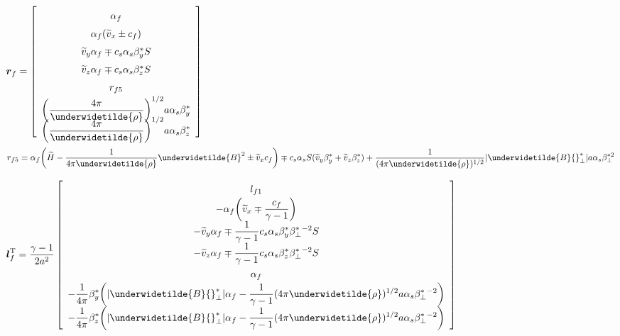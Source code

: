 \begin{center}
$\renewcommand{\arraystretch}{1.5}
\mbox{\boldmath $r$}_{f} =
\left[
\begin{array}{c}
\alpha_{f} \\
\alpha_{f} ( \widetilde{v}_{x} \pm c_{f} ) \\
\widetilde{v}_{y} \alpha_{f} \mp c_{s} \alpha_{s} \beta^{\ast}_{y} S  \\
\widetilde{v}_{z} \alpha_{f} \mp c_{s} \alpha_{s} \beta^{\ast}_{z} S  \\
r_{f5} \\
\displaystyle
\biggl( \frac{4 \pi}{\underwidetilde{\rho}} \biggr)^{1/2}
a \alpha_{s} \beta^{\ast}_{y} \vspace{-6pt} \\
\displaystyle
\biggl( \frac{4 \pi}{\underwidetilde{\rho}} \biggr)^{1/2}
a \alpha_{s} \beta^{\ast}_{z} \vspace{-6pt} \\
\end{array}
\right]$ 

\begin{center}
\begin{eqnarray}
\displaystyle
r_{f5} = \alpha_{f} \biggl( \widetilde{H} - \frac1
{4 \pi \underwidetilde{\rho}} \underwidetilde{B}^2 
\pm \widetilde{v}_{x} c_{f} \biggr)
\mp c_{s} \alpha_{s} S ( \widetilde{v}_{y} \beta^{\ast}_{y} + 
\widetilde{v}_{z} \beta^{\ast}_{z} )
+ \frac1{( 4 \pi \underwidetilde{\rho})^{1/2}} 
| \underwidetilde{B}{}_{\bot}^{\ast} |
a \alpha_{s} \beta^{\ast 2}_{\bot} \nonumber
\end{eqnarray}
\end{center}

$\renewcommand{\arraystretch}{1.5}
\displaystyle
\mbox{\boldmath $l$}_{f}^{\rm T} =
\frac{\gamma -1}{2 a^2}
\left[
\begin{array}{c}
l_{f1} \\
\displaystyle
- \alpha_{f} \biggl( \widetilde{v}_{x} \mp \frac{c_{f}}{\gamma -1} \biggr) \\
\displaystyle
- \widetilde{v}_{y} \alpha_{f} \mp \frac1{\gamma -1} c_{s} \alpha_{s}
\beta^{\ast}_{y} \beta^{\ast}_{\bot} {}^{-2} S \\
\displaystyle
- \widetilde{v}_{z} \alpha_{f} \mp \frac1{\gamma -1} c_{s} \alpha_{s}
\beta^{\ast}_{z} \beta^{\ast}_{\bot} {}^{-2} S \\
\alpha_{f} \\
\displaystyle
- \frac1{4 \pi} \beta^{\ast}_{y} \biggl( 
| \underwidetilde{B}{}^{\ast}_{\bot} | \alpha_{f} - \frac1{\gamma -1} 
(4 \pi \underwidetilde{\rho})^{1/2} a \alpha_{s} 
\beta^{\ast}_{\bot} {}^{-2} \biggr)\\
\displaystyle
- \frac1{4 \pi} \beta^{\ast}_{z} \biggl( 
| \underwidetilde{B}{}^{\ast}_{\bot} | \alpha_{f} - \frac1{\gamma -1} 
(4 \pi \underwidetilde{\rho})^{1/2} a \alpha_{s} 
\beta^{\ast}_{\bot} {}^{-2} \biggr)\\
\end{array}
\right]$ 
\end{center}

